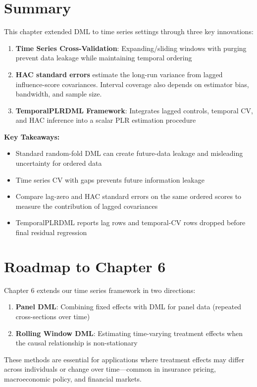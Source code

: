 \section{Summary}\label{sec:ch05_summary}

This chapter extended DML to time series settings through three key innovations:

\begin{enumerate}
    \item \textbf{Time Series Cross-Validation}: Expanding/sliding windows with purging prevent data leakage while maintaining temporal ordering

    \item \textbf{HAC standard errors} estimate the long-run variance from lagged influence-score covariances. Interval coverage also depends on estimator bias, bandwidth, and sample size.

    \item \textbf{TemporalPLRDML Framework}: Integrates lagged controls, temporal CV, and HAC inference into a scalar PLR estimation procedure
\end{enumerate}

\textbf{Key Takeaways:}
\begin{itemize}
    \item Standard random-fold DML can create future-data leakage and misleading uncertainty for ordered data
    \item Time series CV with gaps prevents future information leakage
    \item Compare lag-zero and HAC standard errors on the same ordered scores to measure the contribution of lagged covariances
    \item TemporalPLRDML reports lag rows and temporal-CV rows dropped before final residual regression
\end{itemize}

\section{Roadmap to Chapter 6}\label{sec:ch05_roadmap}

Chapter 6 extends our time series framework in two directions:

\begin{enumerate}
    \item \textbf{Panel DML}: Combining fixed effects with DML for panel data (repeated cross-sections over time)

    \item \textbf{Rolling Window DML}: Estimating time-varying treatment effects when the causal relationship is non-stationary
\end{enumerate}

These methods are essential for applications where treatment effects may differ across individuals or change over time---common in insurance pricing, macroeconomic policy, and financial markets.
